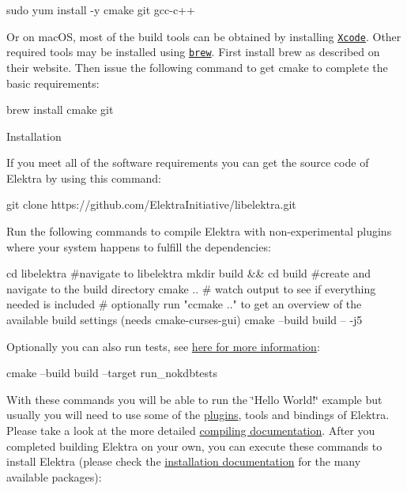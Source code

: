 \begin{DoxyCode}
sudo yum install -y cmake git gcc-c++
\end{DoxyCode}


Or on mac\+OS, most of the build tools can be obtained by installing \href{https://developer.apple.com/xcode/}{\tt Xcode}. Other required tools may be installed using \href{https://brew.sh/}{\tt brew}. First install brew as described on their website. Then issue the following command to get cmake to complete the basic requirements\+:


\begin{DoxyCode}
brew install cmake git
\end{DoxyCode}



\begin{DoxyItemize}
\item Installation

If you meet all of the software requirements you can get the source code of Elektra by using this command\+:
\end{DoxyItemize}


\begin{DoxyCode}
git clone https://github.com/ElektraInitiative/libelektra.git
\end{DoxyCode}


Run the following commands to compile Elektra with non-\/experimental plugins where your system happens to fulfill the dependencies\+:


\begin{DoxyCode}
cd libelektra  #navigate to libelektra
mkdir build  && cd build  #create and navigate to the build directory
cmake ..  # watch output to see if everything needed is included
#  optionally run "ccmake .." to get an overview of the available build settings (needs cmake-curses-gui)
cmake --build build -- -j5
\end{DoxyCode}


Optionally you can also run tests, see \hyperlink{doc_TESTING_md}{here for more information}\+:


\begin{DoxyCode}
cmake --build build --target run\_nokdbtests
\end{DoxyCode}


With these commands you will be able to run the \char`\"{}\+Hello World!\char`\"{} example but usually you will need to use some of the \hyperlink{src_plugins_README_md}{plugins}, tools and bindings of Elektra. Please take a look at the more detailed \hyperlink{doc_COMPILE_md}{compiling documentation}. After you completed building Elektra on your own, you can execute these commands to install Elektra (please check the \hyperlink{doc_INSTALL_md}{installation documentation} for the many available packages)\+:


